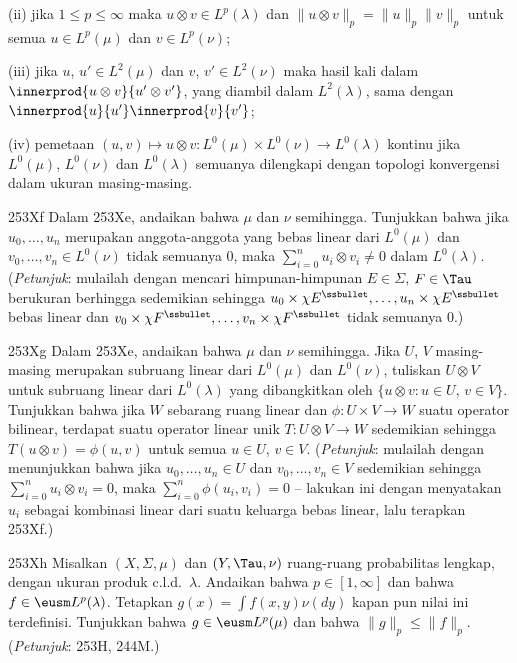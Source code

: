{\quad (ii) jika $1\le p\le\infty$ maka $u\otimes v\in L^p(\lambda)$ dan
$\|u\otimes v\|_p=\|u\|_p\|v\|_p$ untuk semua $u\in L^p(\mu)$ dan
$v\in L^p(\nu)$;

\quad (iii) jika $u$, $u'\in L^2(\mu)$ dan $v$, $v'\in L^2(\nu)$ maka
hasil kali dalam $\innerprod{u\otimes v}{u'\otimes v'}$, yang diambil
dalam $L^2(\lambda)$, sama dengan
$\innerprod{u}{u'}\innerprod{v}{v'}$;

\quad (iv) pemetaan
$(u,v)\mapsto u\otimes v:L^0(\mu)\times L^0(\nu)\to L^0(\lambda)$
kontinu jika $L^0(\mu)$, $L^0(\nu)$ dan $L^0(\lambda)$
semuanya dilengkapi dengan topologi konvergensi dalam ukuran masing-masing.

\spheader 253Xf Dalam 253Xe, andaikan bahwa $\mu$ dan $\nu$ semihingga.
Tunjukkan bahwa jika $u_0,\ldots,u_n$ merupakan anggota-anggota yang bebas
linear dari $L^0(\mu)$ dan $v_0,\ldots,v_n\in L^0(\nu)$ tidak semuanya
$0$, maka $\sum_{i=0}^nu_i\otimes v_i\ne 0$ dalam $L^0(\lambda)$.
({\it Petunjuk\/}: mulailah dengan mencari himpunan-himpunan
$E\in\Sigma$, $F\in\Tau$ berukuran berhingga sedemikian sehingga
$u_0\times\chi E^{\ssbullet},\ldots,u_n\times\chi E^{\ssbullet}$
bebas linear dan
$v_0\times\chi F^{\ssbullet},\ldots,v_n\times\chi F^{\ssbullet}$
tidak semuanya $0$.)

\spheader 253Xg Dalam 253Xe, andaikan bahwa $\mu$ dan $\nu$ semihingga.
Jika $U$, $V$ masing-masing merupakan subruang linear dari $L^0(\mu)$
dan $L^0(\nu)$, tuliskan $U\otimes V$ untuk subruang linear dari
$L^0(\lambda)$ yang dibangkitkan oleh
$\{u\otimes v:u\in U,\,v\in V\}$. Tunjukkan bahwa jika $W$ sebarang ruang
linear dan $\phi:U\times V\to W$ suatu operator bilinear, terdapat suatu
operator linear unik $T:U\otimes V\to W$
sedemikian sehingga $T(u\otimes v)=\phi(u,v)$ untuk semua $u\in U$,
$v\in V$. ({\it Petunjuk\/}: mulailah dengan menunjukkan bahwa jika
$u_0,\ldots,u_n\in U$ dan $v_0,\ldots,v_n\in V$ sedemikian sehingga
$\sum_{i=0}^nu_i\otimes v_i=0$, maka
$\sum_{i=0}^n\phi(u_i,v_i)=0$ -- lakukan ini dengan menyatakan $u_i$
sebagai kombinasi linear dari suatu keluarga bebas linear, lalu terapkan
253Xf.)

\sqheader 253Xh Misalkan $(X,\Sigma,\mu)$ dan $(Y,\Tau,\nu)$ ruang-ruang
probabilitas lengkap, dengan ukuran produk c.l.d.\ $\lambda$. Andaikan
bahwa $p\in[1,\infty]$ dan bahwa $f\in\eusm L^p(\lambda)$. Tetapkan
$g(x)=\int f(x,y)\nu(dy)$ kapan pun nilai ini terdefinisi. Tunjukkan bahwa
$g\in\eusm L^p(\mu)$ dan bahwa $\|g\|_p\le\|f\|_p$.
({\it Petunjuk\/}: 253H, 244M.)

}
